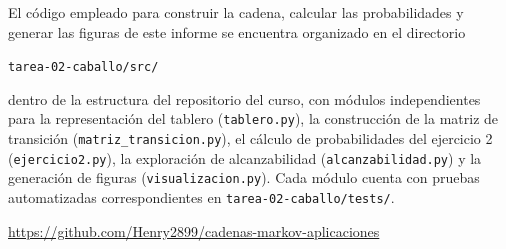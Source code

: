 \documentclass[12pt,a4paper]{article}
\begin{document}
El código empleado para construir la cadena, calcular las
probabilidades y generar las figuras de este informe se encuentra
organizado en el directorio

\begin{center}
\texttt{tarea-02-caballo/src/}
\end{center}

dentro de la estructura del repositorio del curso, con módulos
independientes para la representación del tablero
(\texttt{tablero.py}), la construcción de la matriz de transición
(\texttt{matriz\_transicion.py}), el cálculo de probabilidades del
ejercicio 2 (\texttt{ejercicio2.py}), la exploración de alcanzabilidad
(\texttt{alcanzabilidad.py}) y la generación de figuras
(\texttt{visualizacion.py}). Cada módulo cuenta con pruebas
automatizadas correspondientes en \texttt{tarea-02-caballo/tests/}.

\url{https://github.com/Henry2899/cadenas-markov-aplicaciones}
\end{document}
